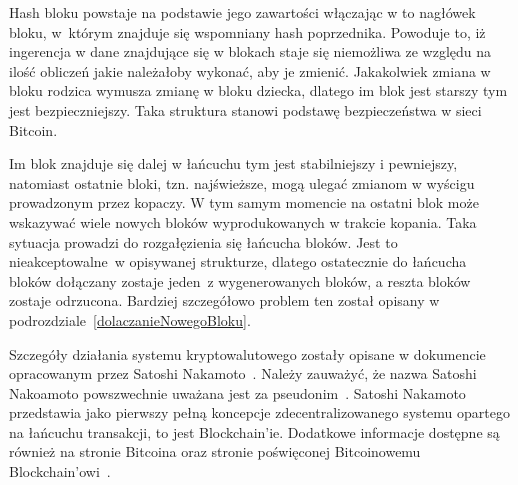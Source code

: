 \documentclass[12pt, oneside, final, openany]{mgr}
\begin{document}
\indent Hash bloku powstaje na podstawie jego zawartości włączając w to nagłówek bloku, w~którym znajduje się wspomniany hash poprzednika. Powoduje to, iż ingerencja w dane znajdujące się w blokach staje się niemożliwa ze względu na ilość obliczeń jakie należałoby wykonać, aby je zmienić. Jakakolwiek zmiana w bloku rodzica wymusza zmianę w bloku dziecka, dlatego im blok jest starszy tym jest bezpieczniejszy. Taka struktura stanowi podstawę bezpieczeństwa w sieci Bitcoin.

\indent Im blok znajduje się dalej w łańcuchu tym jest stabilniejszy i pewniejszy, natomiast ostatnie bloki, tzn. najświeższe, mogą ulegać zmianom w wyścigu prowadzonym przez kopaczy. W tym samym momencie na ostatni blok może wskazywać wiele nowych bloków wyprodukowanych w trakcie kopania. Taka sytuacja prowadzi do rozgałęzienia się łańcucha bloków. Jest to nieakceptowalne~w opisywanej strukturze, dlatego ostatecznie do łańcucha bloków dołączany zostaje jeden~z wygenerowanych bloków, a reszta bloków zostaje odrzucona. Bardziej szczegółowo problem ten został opisany w podrozdziale~\ref{dolaczanieNowegoBloku}.

\indent Szczegóły działania systemu kryptowalutowego zostały opisane w dokumencie opracowanym przez Satoshi Nakamoto~\cite{nakamoto2008bitcoin}. Należy zauważyć, że nazwa Satoshi Nakoamoto powszwechnie uważana jest za pseudonim~\cite{satoshi}. Satoshi Nakamoto przedstawia jako pierwszy pełną koncepcje zdecentralizowanego  systemu opartego na łańcuchu transakcji, to jest Blockchain'ie. Dodatkowe informacje dostępne są również na stronie Bitcoina oraz stronie poświęconej Bitcoinowemu Blockchain'owi~\cite{blockchaininfo, bitcoinorg}.
\end{document}
